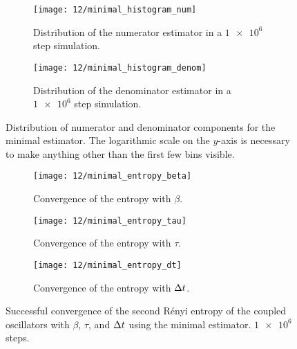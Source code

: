 \begin{figure}
	\setlength{\figspacing}{5 mm}
	\centering
	\begin{subfigure}[b]{\textwidth}
		\texttt{[image: 12/minimal\_histogram\_num]}
		\caption{
			Distribution of the numerator estimator in a $\num{1e6}$ step simulation.
		}
		\vspace{\figspacing}
	\end{subfigure}
	\begin{subfigure}[b]{\textwidth}
		\texttt{[image: 12/minimal\_histogram\_denom]}
		\caption{
			Distribution of the denominator estimator in a $\num{1e6}$ step simulation.
		}
	\end{subfigure}
	\caption[
		Distribution of components for minimal estimator
	]{
		Distribution of numerator and denominator components for the minimal estimator.
		The logarithmic scale on the $y$-axis is necessary to make anything other than the first few bins visible.
	}
	\label{fig:minimal-histogram}
\end{figure}

\begin{figure}
	\setlength{\figspacing}{5 mm}
	\centering
	\begin{subfigure}[b]{\textwidth}
		\texttt{[image: 12/minimal\_entropy\_beta]}
		\caption{
			Convergence of the entropy with $\beta$.
		}
		\vspace{\figspacing}
	\end{subfigure}
	\begin{subfigure}[b]{\textwidth}
		\texttt{[image: 12/minimal\_entropy\_tau]}
		\caption{
			Convergence of the entropy with $\tau$.
		}
		\vspace{\figspacing}
	\end{subfigure}
	\begin{subfigure}[b]{\textwidth}
		\texttt{[image: 12/minimal\_entropy\_dt]}
		\caption{
			Convergence of the entropy with $\Delta t$.
		}
	\end{subfigure}
	\caption[
		Convergence of entropy with minimal estimator
	]{
		Successful convergence of the second Rényi entropy of the coupled oscillators with $\beta$, $\tau$, and $\Delta t$ using the minimal estimator.
		$\num{1e6}$ steps.
		\explainplotentropy{}
	}
		\label{fig:minimal-entropy}
\end{figure}

